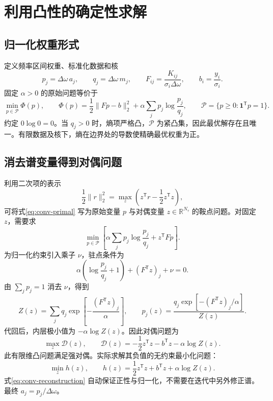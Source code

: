 \documentclass[UTF8,fontset=fandol,11pt]{ctexart}
\begin{document}
\section{利用凸性的确定性求解}
\subsection{归一化权重形式}
定义频率区间权重、标准化数据和核
\begin{equation}
    p_j=\Delta\omega\,a_j,\qquad q_j=\Delta\omega\,m_j,\qquad F_{ij}=\frac{K_{ij}}{\sigma_i\Delta\omega},\qquad b_i=\frac{y_i}{\sigma_i}.
\end{equation}
固定 $\alpha>0$ 的原始问题等价于
\begin{equation}
    \min_{p\in\mathcal P}\Phi(p),\qquad \Phi(p)=\frac12\|Fp-b\|_2^2+\alpha\sum_jp_j\log\frac{p_j}{q_j},\qquad \mathcal P=\{p\geq0:\bm1^{\mathsf T}p=1\}.
    \label{eq:conv-primal}
\end{equation}
约定 $0\log0=0$。当 $q_j>0$ 时，熵项严格凸，$\mathcal P$ 为紧凸集，因此最优解存在且唯一。有限数据及核下，熵在边界处的导数使精确最优权重为正。

\subsection{消去谱变量得到对偶问题}
利用二次项的表示
\begin{equation}
    \frac12\|r\|_2^2=\max_z\left(z^{\mathsf T}r-\frac12z^{\mathsf T}z\right),
\end{equation}
可将式\eqref{eq:conv-primal} 写为原始变量 $p$ 与对偶变量 $z\in\mathbb R^{N_\tau}$ 的鞍点问题。对固定 $z$，需要求
\begin{equation}
    \min_{p\in\mathcal P}\left[\alpha\sum_jp_j\log\frac{p_j}{q_j}+z^{\mathsf T}Fp\right].
\end{equation}
为归一化约束引入乘子 $\nu$，驻点条件为
\begin{equation}
    \alpha\left(\log\frac{p_j}{q_j}+1\right)+(F^{\mathsf T}z)_j+\nu=0.
\end{equation}
由 $\sum_jp_j=1$ 消去 $\nu$，得到
\begin{equation}
    Z(z)=\sum_jq_j\exp\left[-\frac{(F^{\mathsf T}z)_j}{\alpha}\right],\qquad p_j(z)=\frac{q_j\exp[-(F^{\mathsf T}z)_j/\alpha]}{Z(z)}.
    \label{eq:conv-reconstruction}
\end{equation}
代回后，内层极小值为 $-\alpha\log Z(z)$。因此对偶问题为
\begin{equation}
    \max_z\mathcal D(z),\qquad \mathcal D(z)=-\frac12z^{\mathsf T}z-b^{\mathsf T}z-\alpha\log Z(z).
\end{equation}
此有限维凸问题满足强对偶。实际求解其负值的无约束最小化问题：
\begin{equation}
    \min_z h(z),\qquad h(z)=\frac12z^{\mathsf T}z+b^{\mathsf T}z+\alpha\log Z(z).
\end{equation}
式\eqref{eq:conv-reconstruction} 自动保证正性与归一化，不需要在迭代中另外修正谱。最终 $a_j=p_j/\Delta\omega$。
\end{document}

